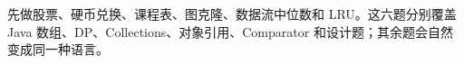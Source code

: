 \begin{transfer}[推荐改写顺序]
先做股票、硬币兑换、课程表、图克隆、数据流中位数和 LRU。这六题分别覆盖 Java 数组、DP、Collections、对象引用、Comparator 和设计题；其余题会自然变成同一种语言。
\end{transfer}
